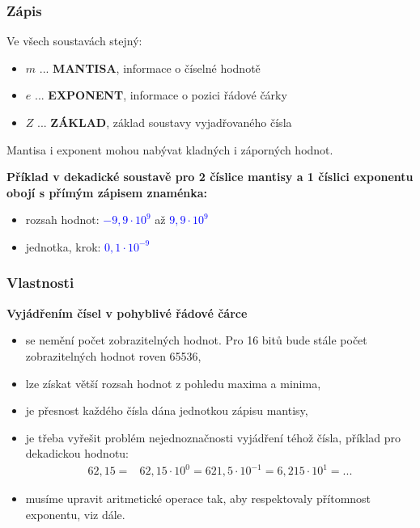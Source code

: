   \begin{frame}
    \frametitle{Zápis}
    \boldmath
    
    Ve všech soustavách stejný:
    \large
    \begin{center}
    \end{center}
    
    \normalsize
    \begin{itemize}
      \item $m$ ... \textbf{MANTISA}, informace o číselné hodnotě
      \item $e$ ... \textbf{EXPONENT}, informace o pozici řádové čárky
      \item $Z$ ... \textbf{ZÁKLAD}, základ soustavy vyjadřovaného čísla
    \end{itemize}
    
    \vspace{3mm}
    Mantisa i exponent mohou nabývat kladných i záporných hodnot.
    
    \vspace{2mm}
    \textbf{Příklad v dekadické soustavě pro 2 číslice mantisy a 1 číslici exponentu obojí s přímým zápisem znaménka:}
    
    \vspace{2mm}
    \begin{itemize}
      \item rozsah hodnot: \textcolor{blue}{$-9,9\cdot 10^{9}$} až \textcolor{blue}{$9,9\cdot 10^{9}$}
      \item jednotka, krok: \textcolor{blue}{$0,1\cdot 10^{-9}$}
    \end{itemize}
	\end{frame}
  \begin{frame}
    \frametitle{Vlastnosti}
    \boldmath
    \textbf{Vyjádřením čísel v pohyblivé řádové čárce}
    \begin{itemize}
      \item se nemění počet zobrazitelných hodnot. Pro 16 bitů bude stále počet zobrazitelných hodnot roven 65536,
      \item lze získat větší rozsah hodnot z pohledu maxima a minima,
      \item je přesnost každého čísla dána jednotkou zápisu mantisy,
      \item je třeba vyřešit problém nejednoznačnosti vyjádření téhož čísla, příklad pro dekadickou hodnotu:
      \small
        \begin{align*}
        62,15 =& 62,15 \cdot 10^{0} = 621,5 \cdot 10^{-1} = 6,215 \cdot 10^{1} = ...
        \end{align*}
      \normalsize
      \item musíme upravit aritmetické operace tak, aby respektovaly přítomnost exponentu, viz dále.
    \end{itemize}
	\end{frame}
  
